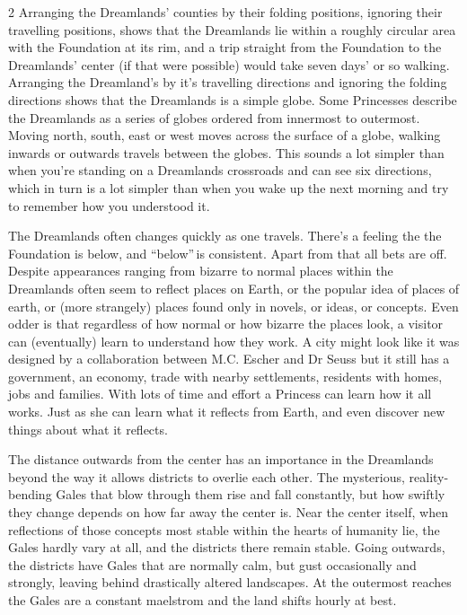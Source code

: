 \begin{multicols}{2}
Arranging the Dreamlands' counties by their folding positions, ignoring their travelling positions, shows that the Dreamlands lie within a roughly circular area with the Foundation at its rim, and a trip straight from the Foundation to the Dreamlands' center (if that were possible) would take seven days' or so walking. Arranging the Dreamland's by it's travelling directions and ignoring the folding directions shows that the Dreamlands is a simple globe. Some Princesses describe the Dreamlands as a series of globes ordered from innermost to outermost. Moving north, south, east or west moves across the surface of a globe, walking inwards or outwards travels between the globes. This sounds a lot simpler than when you're standing on a Dreamlands crossroads and can see six directions, which in turn is a lot simpler than when you wake up the next morning and try to remember how you understood it. 

The Dreamlands often changes quickly as one travels. There's a feeling the the Foundation is below, and \textquotedblleft below\textquotedblright\,is consistent. Apart from that all bets are off. Despite appearances ranging from bizarre to normal places within the Dreamlands often seem to reflect places on Earth, or the popular idea of places of earth, or (more strangely) places found only in novels, or ideas, or concepts. Even odder is that regardless of how normal or how bizarre the places look, a visitor can (eventually) learn to understand how they work. A city might look like it was designed by a collaboration between M.C. Escher and Dr Seuss but it still has a government, an economy, trade with nearby settlements, residents with homes, jobs and families. With lots of time and effort a Princess can learn how it all works. Just as she can learn what it reflects from Earth, and even discover new things about what it reflects.

The distance outwards from the center has an importance in the Dreamlands beyond the way it allows districts to overlie each other.  The mysterious, reality-bending Gales that blow through them rise and fall constantly, but how swiftly they change depends on how far away the center is.  Near the center itself, when reflections of those concepts most stable within the hearts of humanity lie, the Gales hardly vary at all, and the districts there remain stable.  Going outwards, the districts have Gales that are normally calm, but gust occasionally and strongly, leaving behind drastically altered landscapes. At the outermost reaches the Gales are a constant maelstrom and the land shifts hourly at best.


\end{multicols}
